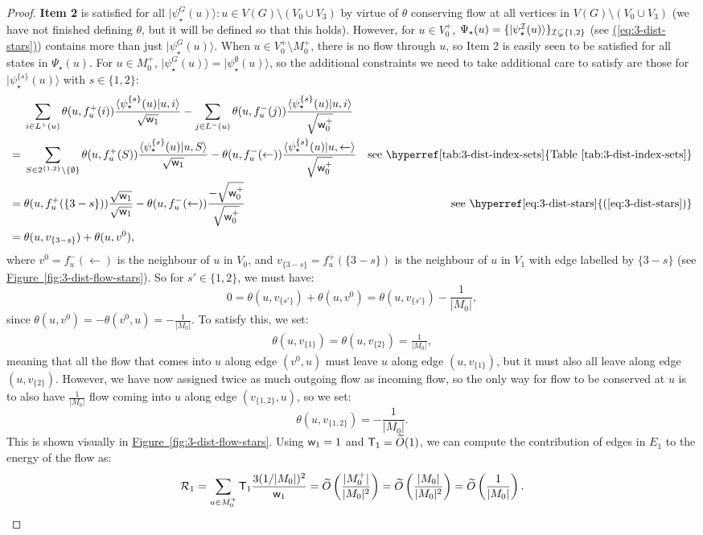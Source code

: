 \documentclass{article}
\newcommand{\eq}[1]{\hyperref[eq:#1]{(\ref*{eq:#1})}}
\newcommand{\tabl}[1]{\hyperref[tab:#1]{Table~\ref*{tab:#1}}}
\newcommand{\fig}[1]{\hyperref[fig:#1]{Figure~\ref*{fig:#1}}}
\def\ket#1{{\lvert}#1\rangle}
\renewcommand{\>}{\rangle}
\newcommand{\<}{\langle}
\renewcommand{\(}{\left(}
\renewcommand{\)}{\right)}
\def\braket#1#2{{{\langle}#1\vert}#2\rangle}
\def\w{{\sf w}}
\begin{document}
\begin{proof}
\textbf{Item 2} is satisfied for all $\ket{\psi_\star^G(u)}:u\in V(G)\setminus (V_0\cup V_3)$ by virtue of $\theta$ conserving flow at all vertices in $V(G)\setminus (V_0\cup V_3)$ (we have not finished defining $\theta$, but it will be defined so that this holds). However, for $u\in V_0^+$, $\Psi_\star(u)=\{\ket{\psi_\star^{{\cal I}}(u)}\}_{{\cal I}\subsetneq\{1,2\}}$ (see \eq{3-dist-stars}) contains more than just $\ket{\psi_\star^G(u)}$. When $u\in V_0^+\setminus M_0^+$, there is no flow through $u$, so Item 2 is easily seen to be satisfied for all states in $\Psi_\star(u)$. For $u\in M_0^+$, $\ket{\psi_\star^G(u)}=\ket{\psi_\star^{\emptyset}(u)}$, so the additional constraints we need to take additional care to satisfy are those for $\ket{\psi_\star^{\{s\}}(u)}$ with $s\in \{1,2\}$:
\begin{align*}
&\sum_{i\in L^+(u)}\theta(u,f^+_{u}(i))\frac{\braket{\psi_\star^{\{s\}}(u)}{u,i}}{\sqrt{\w_1}}-\sum_{j\in L^-(u)}\theta(u,f^-_{u}(j))\frac{\braket{\psi_\star^{\{s\}}(u)}{u,i}}{\sqrt{\w_0^+}}\\
={}& \sum_{S \in 2^{\{1,2\}} \setminus \{\emptyset\}}\theta(u,f^+_{u}(S))\frac{\braket{\psi_\star^{\{s\}}(u)}{u,S}}{\sqrt{\w_1}}-\theta(u,f^-_{u}(\leftarrow))\frac{\braket{\psi_\star^{\{s\}}(u)}{u,\leftarrow}}{\sqrt{\w_0^+}} & \mbox{see \tabl{3-dist-index-sets}}\\
={}&\theta(u,f^+_{u}(\{3-s\}))\frac{\sqrt{\w_1}}{\sqrt{\w_1}}-\theta(u,f^-_u(\leftarrow))\frac{-\sqrt{\w_0^+}}{\sqrt{\w_0^+}} & \mbox{see \eq{3-dist-stars}}\\
={}&\theta(u,v_{\{3-s\}})+\theta(u,v^0),
\end{align*}
where $v^0 = f^-_u(\leftarrow)$ is the neighbour of $u$ in $V_0$, and $v_{\{3-s\}} = f^+_u(\{3-s\})$ is the neighbour of $u$ in $V_1$ with edge labelled by $\{3-s\}$ (see \fig{3-dist-flow-stars}). So for $s'\in\{1,2\}$, we must have:
$$0=\theta(u,v_{\{s'\}}) + \theta(u,v^0) = \theta(u,v_{\{s'\}}) - \frac{1}{|M_0|},$$
since $\theta(u,v^0) = -\theta(v^0,u) = -\frac{1}{|M_0|}$. To satisfy this, we set:
\begin{align*}
\theta(u,v_{\{1\}}) = \theta(u,v_{\{2\}}) = \frac{1}{|M_0|},
\end{align*}
meaning that all the flow that comes into $u$ along edge $(v^0,u)$ must leave $u$ along edge $(u,v_{\{1\}})$, but it must also all leave along edge $(u,v_{\{2\}})$. However, we have now assigned twice as much outgoing flow as incoming flow, so the only way for flow to be conserved at $u$ is to also have $\frac{1}{|M_0|}$ flow coming into $u$ along edge $(v_{\{1,2\}},u)$, so we set:
$$\theta(u,v_{\{1,2\}}) = -\frac{1}{|M_0|}.$$
This is shown visually in \fig{3-dist-flow-stars}.
Using $\w_1=1$ and ${\sf T}_1=\widetilde{O}(1)$, we can compute the contribution of edges in $E_1$ to the energy of the flow as:
\begin{equation}
{\cal R}_1 = \sum_{u\in M_0^+}{\sf T}_1\frac{3(1/|M_0|)^2}{\w_1} = \widetilde{O}\left(\frac{|M_0^+|}{|M_0|^2}\right)=\widetilde{O}\left(\frac{|M_0|}{|M_0|^2}\right)=\widetilde{O}\left(\frac{1}{|M_0|}\right).
\label{eq:R2}
\end{equation}


\end{proof}
\end{document}

